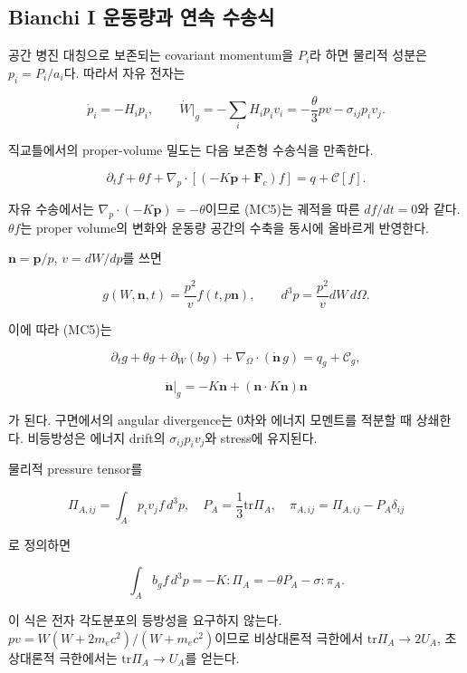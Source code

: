 \documentclass[11pt,a4paper]{article}
\begin{document}
\hypertarget{bianchi-i-uxc6b4uxb3d9uxb7c9uxacfc-uxc5f0uxc18d-uxc218uxc1a1uxc2dd}{%
\subsection{Bianchi I 운동량과 연속 수송식}\label{bianchi-i-uxc6b4uxb3d9uxb7c9uxacfc-uxc5f0uxc18d-uxc218uxc1a1uxc2dd}}

공간 병진 대칭으로 보존되는 covariant momentum을 \(P_i\)라 하면 물리적 성분은 \(p_i=P_i/a_i\)다. 따라서 자유 전자는

\[
\dot p_i=-H_i p_i,\qquad
\dot W\big|_g=-\sum_iH_ip_iv_i
=-\frac{\theta}{3}p v-\sigma_{ij}p_iv_j.
\tag{MC4}
\]

직교틀에서의 proper-volume 밀도는 다음 보존형 수송식을 만족한다.

\[
\partial_t f+\theta f+
\nabla_p\cdot[(-K\boldsymbol p+\boldsymbol F_c)f]
=q+\mathcal C[f].
\tag{MC5}
\]

자유 수송에서는 \(\nabla_p\cdot(-K\boldsymbol p)=-\theta\)이므로 (MC5)는 궤적을 따른 \(df/dt=0\)와 같다. \(\theta f\)는 proper volume의 변화와 운동량 공간의 수축을 동시에 올바르게 반영한다.

\(\boldsymbol n=\boldsymbol p/p\), \(v=dW/dp\)를 쓰면

\[
g(W,\boldsymbol n,t)=\frac{p^2}{v}f(t,p\boldsymbol n),\qquad
d^3p=\frac{p^2}{v}dW\,d\Omega.
\tag{MC6}
\]

이에 따라 (MC5)는

\[
\partial_tg+\theta g+\partial_W(bg)+
\nabla_{\!\Omega}\cdot(\dot{\boldsymbol n}\,g)
=q_g+\mathcal C_g,
\tag{MC7}
\]

\[
\dot{\boldsymbol n}\big|_g=-K\boldsymbol n+
(\boldsymbol n\cdot K\boldsymbol n)\boldsymbol n
\tag{MC8}
\]

가 된다. 구면에서의 angular divergence는 0차와 에너지 모멘트를 적분할 때 상쇄한다. 비등방성은 에너지 drift의 \(\sigma_{ij}p_iv_j\)와 stress에 유지된다.

물리적 pressure tensor를

\[
\Pi_{A,ij}=\int_Ap_iv_jf\,d^3p,
\quad P_A=\frac13\mathrm{tr}\Pi_A,
\quad\pi_{A,ij}=\Pi_{A,ij}-P_A\delta_{ij}
\tag{MC9}
\]

로 정의하면

\[
\int_A b_g f\,d^3p=-K:\Pi_A=-\theta P_A-\sigma:\pi_A.
\tag{MC10}
\]

이 식은 전자 각도분포의 등방성을 요구하지 않는다. \(pv=W(W+2m_ec^2)/(W+m_ec^2)\)이므로 비상대론적 극한에서 \(\mathrm{tr}\Pi_A\to2U_A\), 초상대론적 극한에서는 \(\mathrm{tr}\Pi_A\to U_A\)를 얻는다.
\end{document}
